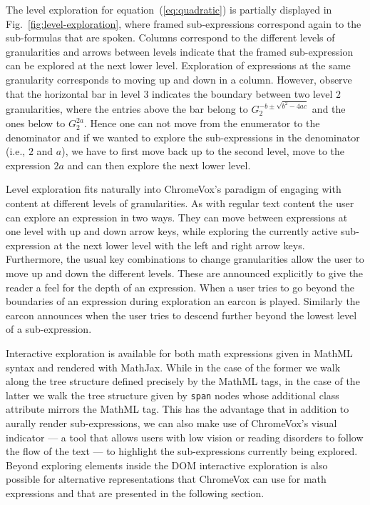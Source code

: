 \documentclass{sig-alternate}
\begin{document}
The level exploration for equation~(\ref{eq:quadratic}) is partially displayed
in Fig.~\ref{fig:level-exploration}, where framed sub-expressions correspond
again to the sub-formulas that are spoken. Columns correspond to the different
levels of granularities and arrows between levels indicate that the framed
sub-expression can be explored at the next lower level. Exploration of
expressions at the same granularity corresponds to moving up and down in a
column. However, observe that the horizontal bar in level $3$ indicates the
boundary between two level $2$ granularities, where the entries above the bar
belong to $G^{-b\pm\sqrt{b^2-4ac}}_2$ and the ones below to $G^{2a}_2$. Hence
one can not move from the enumerator to the denominator and if we wanted to
explore the sub-expressions in the denominator (i.e., $2$ and $a$), we have to
first move back up to the second level, move to the expression $2a$ and can then
explore the next lower level.

Level exploration fits naturally into ChromeVox's para\-digm of engaging with
content at different levels of granularities. As with regular text content the
user can explore an expression in two ways. They can move between expressions at
one level with up and down arrow keys, while exploring the currently active
sub-expression at the next lower level with the left and right arrow
keys. Furthermore, the usual key combinations to change granularities allow the
user to move up and down the different levels. These are announced explicitly to
give the reader a feel for the depth of an expression.  When a user tries to go
beyond the boundaries of an expression during exploration an earcon is
played. Similarly the earcon announces when the user tries to descend further
beyond the lowest level of a sub-expression.

Interactive exploration is available for both math expressions given in MathML
syntax and rendered with MathJax. While in the case of the former we walk along
the tree structure defined precisely by the MathML tags, in the case of the
latter we walk the tree structure given by \texttt{span} nodes whose additional
class attribute mirrors the MathML tag. This has the advantage that in addition
to aurally render sub-expressions, we can also make use of ChromeVox's visual
indicator --- a tool that allows users with low vision or reading disorders to
follow the flow of the text --- to highlight the sub-expressions currently being
explored. Beyond exploring elements inside the DOM interactive exploration is
also possible for alternative representations that ChromeVox can use for math
expressions and that are presented in the following section.
\end{document}
